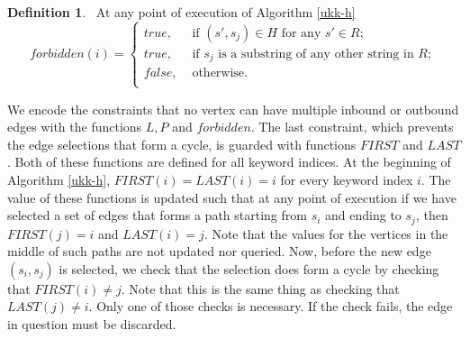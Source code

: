 \documentclass[english,twoside,censored,csm,algorithms-track-2020]{HYthesisML}
\theoremstyle{plain}
\theoremstyle{definition}
\newtheorem{definition}[theorem]{Definition}
\begin{document}
\begin{definition}~\label{def-forbidden}
  At any point of execution of Algorithm \ref{ukk-h}
  \[
  forbidden(i) =
  \begin{cases}
    true, &\text{ if }  (s',s_j)\in H \text{ for any } s'\in R; \\
    true, &\text{ if }  s_j \text{ is a substring of any other string in } R; \\
    false, &\text{ otherwise}. \\
  \end{cases}
  \]
\end{definition}

We encode the constraints that no vertex can have multiple inbound or outbound edges
with the functions $L, P$ and $forbidden$. The last constraint, which prevents the edge selections
that form a cycle, is guarded with functions $FIRST$ and $LAST$. Both of these functions are defined
for all keyword indices. At the beginning of Algorithm \ref{ukk-h}, $FIRST(i) = LAST(i) = i$
for every keyword index $i$. The value of these functions is updated such that at any point of execution
if we have selected a set of edges that forms a path starting from $s_i$ and ending to $s_j$, then
$FIRST(j)=i$ and $LAST(i)=j$. Note that the values for the vertices in the middle of such paths are
not updated nor queried. Now, before the new edge $(s_i,s_j)$ is selected, we check that the
selection does form a cycle by checking that $FIRST(i) \neq j$. Note that this is the same thing
as checking that $LAST(j) \neq i$. Only one of those checks is necessary. If the check fails,
the edge in question must be discarded. 
\end{document}
